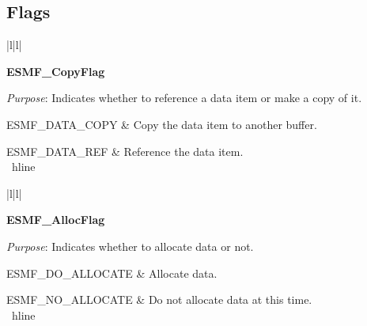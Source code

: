 
\subsection{Flags}


\begin{tabular}{|l|l|}
\hline

{\bf ESMF\_CopyFlag} \\ \hline

{{\it Purpose}:  
Indicates whether to reference a data item or make a copy of it.} \\ \hline

ESMF\_DATA\_COPY & Copy the data item to another buffer. \\ \hline

ESMF\_DATA\_REF & Reference the data item. \\ \ hline
\end{tabular}


\begin{tabular}{|l|l|}
\hline

{\bf ESMF\_AllocFlag} \\ \hline

{{\it Purpose}:  
Indicates whether to allocate data or not.} \\ \hline

ESMF\_DO\_ALLOCATE & Allocate data. \\ \hline

ESMF\_NO\_ALLOCATE & Do not allocate data at this time. \\ \ hline
\end{tabular}

